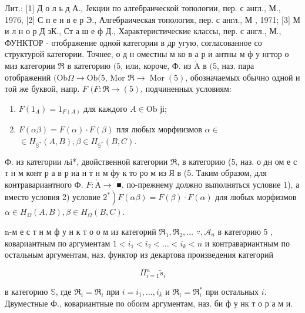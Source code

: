 \documentclass[10pt]{article}
\def\AA{\mathring{\mathrm{A}}}
\begin{document}
Лит.: [1] Д о л ь д А., Јекции по алгебраической топологии, пер. с англ., М., 1976, [2] С п е н в е р Э., Алгебраическая топология, пер. с англ., М , 1971; [3] М и л н о р Д зК., Ст а ш е ф Д., Характеристические классы, пер. с англ., М., ФУНКТОР - отображение одной категории в др угую, согласованное со структурой категории. Точнее, о д н оместны м ко в а р и антны м ф у нгтор о миз категории $\Re$ в категорию $(5$, или, короче, Ф. из $\AA$ в $(5$, наз. пара отображений $(\mathrm{Ob} \Omega \rightarrow \mathrm{Ob}(5$, Mor $\Re \rightarrow \operatorname{Mor}(5)$, обозначаемых обычно одной и той же буквой, напр. $F$ $(F: \Re \longrightarrow(5)$, подчиненных условиям:



\begin{enumerate}

  \item $F\left(1_{A}\right)=1_{F(A)}$ для каждого $A \in \mathrm{Ob}$ јі;



  \item $F(\alpha \beta)=F(\alpha) \cdot F(\beta)$ пля любых морфиизмов $\alpha \in$ $\in H_{\mathbb{S}^{*}}(A, B), \beta \in H_{\mathbb{S}^{*}}(B, C)$.



\end{enumerate}



Ф. из категории љі*, двойственной категории $\Re$, в категорию (5, наз. о дн ом е с т н м конт р а в р иа н т н м фу к то ро м из Я в (5. Таким образом, для контравариантного Ф. $F: \AA \longrightarrow$ ■. по-прежнему должно выполняться условие 1), а вместо условия 2) условие $\left.2^{*}\right) F(\alpha \beta)=F(\beta) \cdot F(\alpha)$ для любых морфизмов $\alpha \in H_{\mathfrak{\Omega}}(A, B), \beta \in H_{\Omega}(B, C)$.



n-м е с т н м ф у н к т о о м из категорий $\mathfrak{R}_{1}, \mathfrak{R}_{2}, \ldots$ $\because, \mathscr{A}_{n}$ в категорию 5 , ковариантным по аргументам $1<i_{1}<i_{2}<\ldots<i_{k}<n$ и контравариантным по остальным аргументам, наз. функтор из декартова произведения категорий



\[

\Pi_{i=1}^{n} \tilde{s}_{i}

\]



в категорию $\mathbb{S}$, где $\mathfrak{\Re}_{i}=\Re_{i}$ при $i=i_{1}, \ldots, i_{k}$ и $\Re_{i}=\Re_{i}^{*}$ при остальных $i$. Двуместные Ф., ковариантные по обоим аргументам, наз. би ф у нк т о р а м и.
\end{document}

